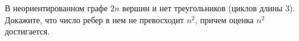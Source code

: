 В неориентированном графе $2n$ вершин и нет треугольников (циклов длины $3$). Докажите, что число ребер в
нем не превосходит $n^2$, причем оценка $n^2$ достигается.
